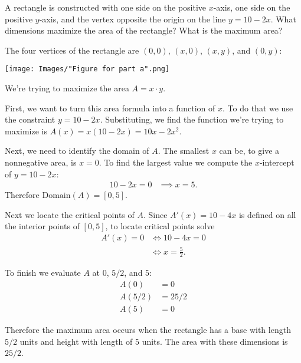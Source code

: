 \documentclass[nooutcomes]{ximera}
\renewenvironment{freeResponse}{
\ifhandout\setbox0\vbox\bgroup\else
\begin{trivlist}\item[\hskip \labelsep\bfseries Solution:\hspace{2ex}]
\fi}
{\ifhandout\egroup\else
\end{trivlist}
\fi}
\begin{document}
\begin{problem}
  A rectangle is constructed with one side on the positive $x$-axis, one side on the positive $y$-axis, and the vertex opposite the origin on the line $y=10-2x$.
  What dimensions maximize the area of the rectangle?
  What is the maximum area?
  \begin{freeResponse}
    The four vertices of the rectangle are $(0, 0)$, $(x, 0)$, $(x, y)$, and $(0, y)$:
    \begin{center}
      \texttt{[image: Images/"Figure for part a".png]}
    \end{center}
    We're trying to maximize the area $A = x \cdot y$.

    First, we want to turn this area formula into a function of $x$.
    To do that we use the constraint $y = 10 - 2x$.
    Substituting, we find the function we're trying to maximize is $A(x) = x (10 - 2x) = 10x - 2x^2$.

    Next, we need to identify the domain of $A$.
    The smallest $x$ can be, to give a nonnegative area, is $x = 0$.
    To find the largest value we compute the $x$-intercept of $y = 10 - 2x$:
    \begin{align*}
      10 - 2x = 0 &\implies x = 5.
    \end{align*}
    Therefore $\mathrm{Domain}(A) = [0, 5]$.

    Next we locate the critical points of $A$.
    Since $A'(x) = 10 - 4x$ is defined on all the interior points of $[0, 5]$, to locate critical points solve 
    \begin{align*}
      A'(x) = 0 &\iff 10 - 4x = 0\\
                &\iff x = \frac{5}{2}.
    \end{align*}

    To finish we evaluate $A$ at $0$, $5/2$, and $5$:
    \begin{align*}
      A(0) &= 0\\
      A(5/2) &= 25/2\\
      A(5) &= 0
    \end{align*}

    Therefore the maximum area occurs when the rectangle has a base with length $5/2$ units and height with length of $5$ units.
    The area with these dimensions is $25/2$.
  \end{freeResponse}
\end{problem}
\end{document}
